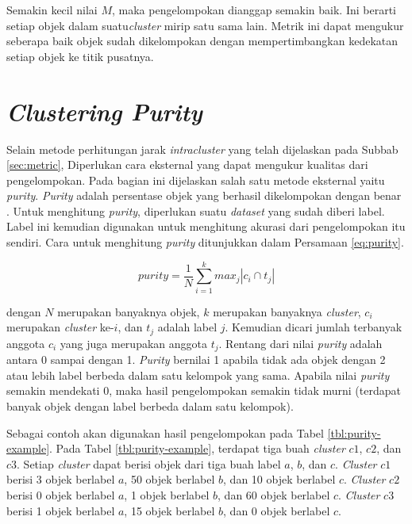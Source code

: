 Semakin kecil nilai $M$, maka pengelompokan dianggap semakin baik. Ini berarti setiap objek dalam suatu\textit{cluster} mirip satu sama lain. Metrik ini dapat mengukur seberapa baik objek sudah dikelompokan dengan mempertimbangkan kedekatan setiap objek ke titik pusatnya.

\section{\textit{Clustering Purity}}
\label{sec:purity}
Selain metode perhitungan jarak \textit{intracluster} yang telah dijelaskan pada Subbab \ref{sec:metric}, Diperlukan cara eksternal yang dapat mengukur kualitas dari pengelompokan. Pada bagian ini dijelaskan salah satu metode eksternal yaitu \textit{purity}. \textit{Purity} adalah persentase objek yang berhasil dikelompokan dengan benar \cite{schutze2008introduction}. Untuk menghitung \textit{purity}, diperlukan suatu \textit{dataset} yang sudah diberi label. Label ini kemudian digunakan untuk menghitung akurasi dari pengelompokan itu sendiri. Cara untuk menghitung \textit{purity} ditunjukkan dalam Persamaan \ref{eq:purity}.

\begin{equation}
	\label{eq:purity}
	purity=\frac{1}{N}\sum^k_{i=1} max_j |c_i \cap t_j|
\end{equation}

dengan $N$ merupakan banyaknya objek, $k$ merupakan banyaknya \textit{cluster}, $c_i$ merupakan \textit{cluster} ke-$i$, dan $t_j$ adalah label $j$. Kemudian dicari jumlah terbanyak anggota $c_i$ yang juga merupakan anggota $t_j$. Rentang dari nilai \textit{purity} adalah antara 0 sampai dengan 1. \textit{Purity} bernilai 1 apabila tidak ada objek dengan 2 atau lebih label berbeda dalam satu kelompok yang sama. Apabila nilai \textit{purity} semakin mendekati 0, maka hasil pengelompokan semakin tidak murni (terdapat banyak objek dengan label berbeda dalam satu kelompok).

Sebagai contoh akan digunakan hasil pengelompokan pada Tabel \ref{tbl:purity-example}. Pada Tabel \ref{tbl:purity-example}, terdapat tiga buah \textit{cluster} $c1$, $c2$, dan $c3$. Setiap \textit{cluster} dapat berisi objek dari tiga buah label $a$, $b$, dan $c$. \textit{Cluster} $c1$ berisi 3 objek berlabel $a$, 50 objek berlabel $b$, dan 10 objek berlabel $c$. \textit{Cluster} $c2$ berisi 0 objek berlabel $a$, 1 objek berlabel $b$, dan 60 objek berlabel $c$. \textit{Cluster} $c3$ berisi 1 objek berlabel $a$, 15 objek berlabel $b$, dan 0 objek berlabel $c$.

